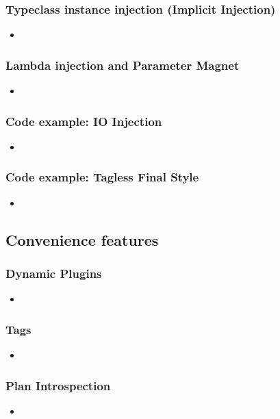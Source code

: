 \documentclass[usenames,dvipsnames]{beamer}
\begin{document}
\begin{frame}
\frametitle{Typeclass instance injection (Implicit Injection)}
\begin{itemize}
\item 
\end{itemize}
\end{frame}

\begin{frame}
\frametitle{Lambda injection and Parameter Magnet}
\begin{itemize}
\item 
\end{itemize}
\end{frame}

\begin{frame}
\frametitle{Code example: IO Injection}
\begin{itemize}
\item 
\end{itemize}
\end{frame}

\begin{frame}
\frametitle{Code example: Tagless Final Style}
\begin{itemize}
\item 
\end{itemize}
\end{frame}

\subsection{Convenience features}

\begin{frame}
\frametitle{Dynamic Plugins}
\begin{itemize}
\item 
\end{itemize}
\end{frame}

\begin{frame}
\frametitle{Tags}
\begin{itemize}
\item 
\end{itemize}
\end{frame}

\begin{frame}
\frametitle{Plan Introspection}
\begin{itemize}
\item 
\end{itemize}
\end{frame}
\end{document}
